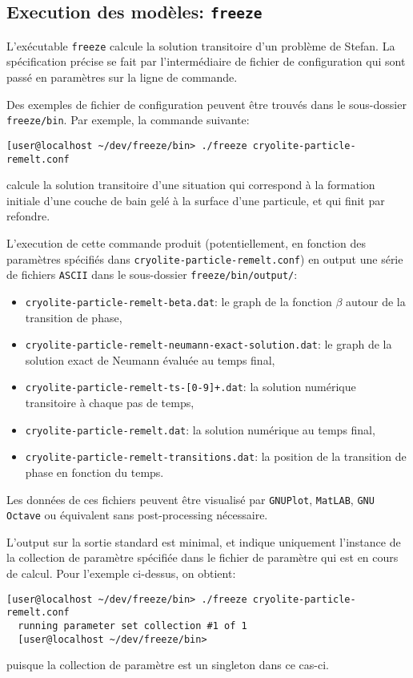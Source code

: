\subsection{Execution des mod\`eles: \texttt{freeze}}
L'ex\'ecutable \texttt{freeze} calcule la solution transitoire d'un
probl\`eme de Stefan. La sp\'ecification pr\'ecise se fait par
l'interm\'ediaire de fichier de configuration qui sont pass\'e en
param\`etres sur la ligne de commande.

Des exemples de fichier de configuration peuvent \^etre trouv\'es dans
le sous-dossier \texttt{freeze/bin}. Par exemple, la commande suivante:
\begin{lstlisting}[language={},frame=single,basicstyle=\ttfamily\footnotesize]
  [user@localhost ~/dev/freeze/bin> ./freeze cryolite-particle-remelt.conf
\end{lstlisting}
calcule la solution transitoire d'une situation qui correspond \`a la
formation initiale d'une couche de bain gel\'e \`a la surface d'une
particule, et qui finit par refondre.

L'execution de cette commande produit (potentiellement, en fonction
des param\`etres sp\'ecifi\'es dans
\texttt{cryolite-particle-remelt.conf}) en output une s\'erie de
fichiers \texttt{ASCII} dans le sous-dossier
\texttt{freeze/bin/output/}:
\begin{itemize}
\item \texttt{cryolite-particle-remelt-beta.dat}: le graph de la
  fonction $\beta$ autour de la transition de phase,
\item \texttt{cryolite-particle-remelt-neumann-exact-solution.dat}: le
  graph de la solution exact de Neumann \'evalu\'ee au temps final,
\item \texttt{cryolite-particle-remelt-ts-[0-9]+.dat}: la solution num\'erique
  transitoire \`a chaque pas de temps,
\item \texttt{cryolite-particle-remelt.dat}: la solution num\'erique
  au temps final,
\item \texttt{cryolite-particle-remelt-transitions.dat}: la position
  de la transition de phase en fonction du temps.
\end{itemize}
Les donn\'ees de ces fichiers peuvent \^etre visualis\'e par
\texttt{GNUPlot}, \texttt{MatLAB}, \texttt{GNU Octave} ou \'equivalent
sans post-processing n\'ecessaire.


L'output sur la sortie standard est minimal, et indique uniquement
l'instance de la collection de param\`etre sp\'ecifi\'ee dans le
fichier de param\`etre qui est en cours de calcul. Pour l'exemple
ci-dessus, on obtient:
\begin{lstlisting}[language={},frame=single,basicstyle=\ttfamily\footnotesize]
  [user@localhost ~/dev/freeze/bin> ./freeze cryolite-particle-remelt.conf
  running parameter set collection #1 of 1
  [user@localhost ~/dev/freeze/bin>
\end{lstlisting}
puisque la collection de param\`etre est un singleton dans ce cas-ci.

